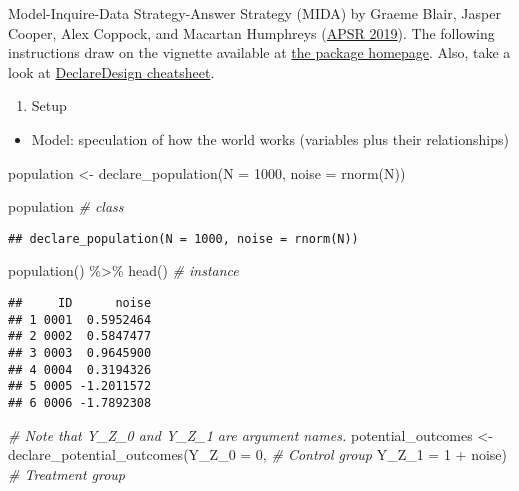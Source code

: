 \documentclass[
]{book}
\newenvironment{Shaded}{\begin{snugshade}}{\end{snugshade}}
\newcommand{\AttributeTok}[1]{\textcolor[rgb]{0.77,0.63,0.00}{#1}}
\newcommand{\CommentTok}[1]{\textcolor[rgb]{0.56,0.35,0.01}{\textit{#1}}}
\newcommand{\DecValTok}[1]{\textcolor[rgb]{0.00,0.00,0.81}{#1}}
\newcommand{\FunctionTok}[1]{\textcolor[rgb]{0.00,0.00,0.00}{#1}}
\newcommand{\NormalTok}[1]{#1}
\newcommand{\OtherTok}[1]{\textcolor[rgb]{0.56,0.35,0.01}{#1}}
\newcommand{\SpecialCharTok}[1]{\textcolor[rgb]{0.00,0.00,0.00}{#1}}
\providecommand{\tightlist}{%
  \setlength{\itemsep}{0pt}\setlength{\parskip}{0pt}}
\begin{document}
Model-Inquire-Data Strategy-Answer Strategy (MIDA) by Graeme Blair, Jasper Cooper, Alex Coppock, and Macartan Humphreys (\href{https://declaredesign.org/declare.pdf}{APSR 2019}). The following instructions draw on the vignette available at \href{https://declaredesign.org/mida/}{the package homepage}. Also, take a look at \href{https://github.com/rstudio/cheatsheets/blob/master/declaredesign.pdf}{DeclareDesign cheatsheet}.

\begin{enumerate}
\def\labelenumi{\arabic{enumi}.}
\tightlist
\item
  Setup
\end{enumerate}

\begin{itemize}
\tightlist
\item
  Model: speculation of how the world works (variables plus their relationships)
\end{itemize}

\begin{Shaded}
\begin{Highlighting}[]
\NormalTok{population }\OtherTok{\textless{}{-}} \FunctionTok{declare\_population}\NormalTok{(}\AttributeTok{N =} \DecValTok{1000}\NormalTok{, }
                                 \AttributeTok{noise =} \FunctionTok{rnorm}\NormalTok{(N))}

\NormalTok{population }\CommentTok{\# class }
\end{Highlighting}
\end{Shaded}

\begin{verbatim}
## declare_population(N = 1000, noise = rnorm(N))
\end{verbatim}

\begin{Shaded}
\begin{Highlighting}[]
\FunctionTok{population}\NormalTok{() }\SpecialCharTok{\%\textgreater{}\%} \FunctionTok{head}\NormalTok{() }\CommentTok{\# instance }
\end{Highlighting}
\end{Shaded}

\begin{verbatim}
##     ID      noise
## 1 0001  0.5952464
## 2 0002  0.5847477
## 3 0003  0.9645900
## 4 0004  0.3194326
## 5 0005 -1.2011572
## 6 0006 -1.7892308
\end{verbatim}

\begin{Shaded}
\begin{Highlighting}[]
\CommentTok{\# Note that Y\_Z\_0 and Y\_Z\_1 are argument names. }
\NormalTok{potential\_outcomes }\OtherTok{\textless{}{-}} \FunctionTok{declare\_potential\_outcomes}\NormalTok{(}\AttributeTok{Y\_Z\_0 =} \DecValTok{0}\NormalTok{, }\CommentTok{\# Control group }
                                                 \AttributeTok{Y\_Z\_1 =} \DecValTok{1} \SpecialCharTok{+}\NormalTok{ noise) }\CommentTok{\# Treatment group }
\end{Highlighting}
\end{Shaded}
\end{document}
